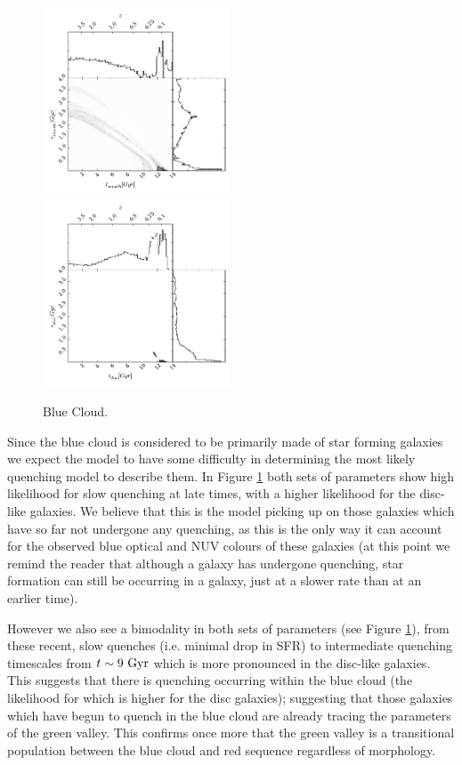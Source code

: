 \documentclass[useAMS,usenatbib]{mn2e}
\begin{document}
\begin{figure}
\includegraphics[width=0.4975\textwidth]{blue_smooth.pdf}
\includegraphics[width=0.4975\textwidth]{blue_disc.pdf}
\caption[8pt]{Blue Cloud.}
\label{blue_c}
\end{figure}

Since the blue cloud is considered to be primarily made of star forming galaxies we expect the model to have some difficulty in determining the most likely quenching model to describe them. In Figure \ref{blue_c} both sets of parameters show high likelihood for slow quenching at late times, with a higher likelihood for the disc-like galaxies. We believe that this is the model picking up on those galaxies which have so far not undergone any quenching, as this is the only way it can account for the observed blue optical and NUV colours of these galaxies (at this point we remind the reader that although a galaxy has undergone quenching, star formation can still be occurring in a galaxy, just at a slower rate than at an earlier time). 

However we also see a bimodality in both sets of parameters (see Figure \ref{blue_c}), from these recent, slow quenches (i.e. minimal drop in SFR) to intermediate quenching timescales from $t\sim9~\rm{Gyr}$ which is more pronounced in the disc-like galaxies. This suggests that there is quenching occurring within the blue cloud (the likelihood for which is higher for the disc galaxies); suggesting that those galaxies which have begun to quench in the blue cloud are already tracing the parameters of the green valley. This confirms once more that the green valley is a transitional population between the blue cloud and red sequence regardless of morphology.
\end{document}
